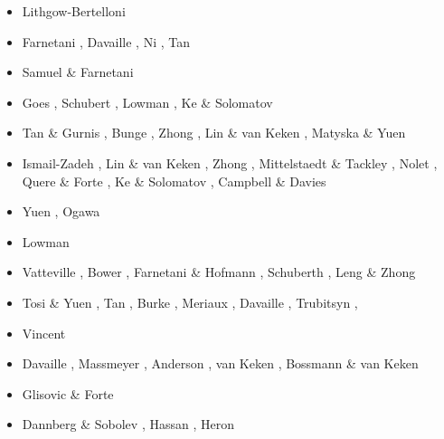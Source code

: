 \begin{scriptsize}
\begin{itemize}
\item[\twothousandone] Lithgow-Bertelloni \cite{lirc01}
\item[\twothousandtwo] Farnetani \etal \cite{falt02}, Davaille \etal \cite{dagl02},
                       Ni \etal \cite{nitg02}, Tan \etal \cite{tagh02}
\item[\twothousandthree] Samuel \& Farnetani \cite{safa03}
\item[\twothousandfour] Goes \etal \cite{goch04}, Schubert \etal \cite{scmo04}, Lowman \etal \cite{lokg04},
                        Ke \& Solomatov \cite{keso04} 
\item[\twothousandfive] Tan \& Gurnis \cite{tagu05}, Bunge \cite{bung05}, Zhong \cite{zhon05}, 
                        Lin \& van Keken \cite{liva05}, Matyska \& Yuen \cite{mayu05}
\item[\twothousandsix] Ismail-Zadeh \etal \cite{isst06}, Lin \& van Keken \cite{liva06a,liva06b}, 
                       Zhong \cite{zhon06}, Mittelstaedt \& Tackley \cite{mita06},
                       Nolet \etal \cite{nokm06}, Quere \& Forte \cite{qufo06}, 
                       Ke \& Solomatov \cite{keso06}, Campbell \& Davies \cite{cada06}
\item[\twothousandseven] Yuen \etal \cite{yumh07}, Ogawa \cite{ogaw07}
\item[\twothousandeight] Lowman \etal \cite{logg08} 
\item[\twothousandnine] Vatteville \etal \cite{vavl09}, Bower \etal \cite{bogj09},
                        Farnetani \& Hofmann \cite{faho09}, Schuberth \etal \cite{scbs09b},
                        Leng \& Zhong \cite{lezh09}
\item[\twothousandeleven] Tosi \& Yuen \cite{toyu11}, Tan \etal \cite{talz11},
                          Burke \cite{burk11}, Meriaux \etal \cite{memm11}, 
                          Davaille \etal \cite{dalt11}, Trubitsyn \etal \cite{tree11},
\item[\twothousandtwelve] Vincent \etal{} \cite{viym12}
\item[\twothousandthirteen] Davaille \etal \cite{dagm13}, Massmeyer \etal \cite{madd13},
                            Anderson \cite{ande13}, van Keken \etal \cite{vadv13}, 
                            Bossmann \& van Keken \cite{bova13}
\item[\twothousandfourteen] Glisovic \& Forte \cite{glfo14} 
\item[\twothousandfifteen] Dannberg \& Sobolev \cite{daso15}, Hassan \etal \cite{hafg15}, 
                           Heron \etal \cite{hels15}

\end{itemize}
\end{scriptsize}
